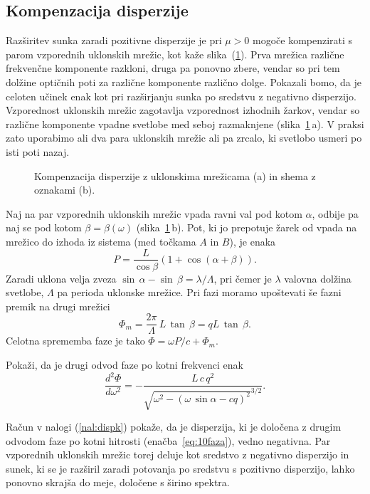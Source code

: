 \subsection*{Kompenzacija disperzije}
Razširitev sunka zaradi pozitivne disperzije je pri $\mu > 0$ mogoče kompenzirati
s parom vzporednih uklonskih mrežic, kot kaže slika~(\ref{fig:comp}).
Prva mrežica različne frekvenčne komponente razkloni, druga pa ponovno
zbere, vendar so pri tem dolžine optičnih poti za različne komponente različno dolge.
Pokazali bomo, da je celoten učinek enak kot pri razširjanju sunka po sredstvu z negativno
disperzijo. Vzporednost uklonskih mrežic zagotavlja vzporednost izhodnih žarkov,
vendar so različne komponente vpadne svetlobe med seboj razmaknjene (slika~\ref{fig:comp}\,a).
V praksi zato uporabimo ali dva para uklonskih mrežic ali pa 
zrcalo, ki svetlobo usmeri po isti poti nazaj. 
\begin{figure}[h]
\centering
\def\svgwidth{120truemm} 

\caption{Kompenzacija disperzije z uklonskima mrežicama (a) in shema z
oznakami (b).}
\label{fig:comp}
\end{figure}

Naj na par vzporednih uklonskih mrežic vpada ravni val pod kotom $\alpha$, odbije
pa naj se pod kotom $\beta = \beta(\omega)$ (slika~\ref{fig:comp}\,b). 
Pot, ki jo prepotuje žarek od vpada na mrežico 
do izhoda iz sistema (med točkama $A$ in $B$), je enaka 
\begin{equation}
P = \frac{L}{\cos\beta} \left(1+\cos(\alpha + \beta)\right).
\end{equation}
Zaradi uklona velja zveza $\sin\,\alpha - \sin\,\beta = \lambda/\Lambda$,
pri čemer je $\lambda$ valovna dolžina svetlobe, $\Lambda$ pa perioda uklonske mrežice. 
Pri fazi moramo upoštevati še fazni premik na drugi mrežici
\begin{equation}
\Phi_m=\frac{2\pi}{\Lambda} \, L \, \tan\,\beta = q L \,\tan\,\beta.
\end{equation}
Celotna sprememba faze je tako $\Phi = \omega P/c + \Phi_m$.

\begin{definition}
\label{nal:dispk}
Pokaži, da je drugi odvod faze po kotni frekvenci enak
\begin{equation}
\frac{d^2 \Phi}{d \omega^2} = - \frac{L\, c\, q^2}
{\sqrt{\omega^2 - (\omega\, \sin\alpha - cq)^2}^{3/2}}.
\label{eq:10faza}
\end{equation}
\end{definition}
Račun v nalogi (\ref{nal:dispk})
pokaže, da je disperzija, ki je določena z drugim odvodom faze po kotni hitrosti 
(enačba~\ref{eq:10faza}), vedno negativna. Par vzporednih uklonskih mrežic
torej deluje kot sredstvo
z negativno disperzijo in sunek, ki se je razširil zaradi potovanja
po sredstvu s pozitivno disperzijo, lahko ponovno skrajša do meje,
določene s širino spektra. 


